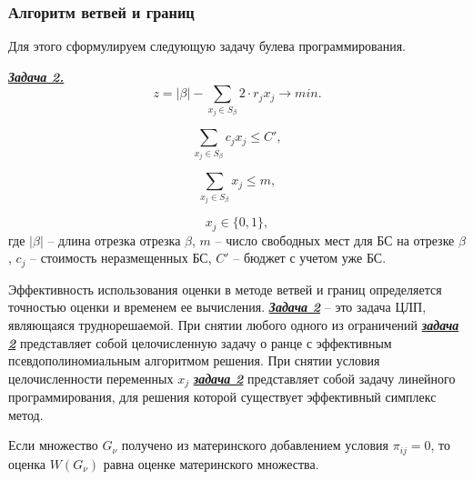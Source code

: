 \begin{frame}
    
    \frametitle{Алгоритм ветвей и границ}
    \fontsize{8pt}{7.2}\selectfont
    Для этого сформулируем следующую задачу булева программирования.

    \underline{\textit{\textbf{Задача 2.}}}
    \begin{displaymath}\label{present:task2}
        z = |\beta| - \sum\limits_{x_j \in S_\beta} 2 \cdot r_j x_j \rightarrow min.
    \end{displaymath}

    \begin{displaymath}\label{eq:part4_task2_cost}
        \sum\limits_{x_j \in S_\beta} c_j x_j \leqslant C',
    \end{displaymath}

    \begin{displaymath}\label{eq:part4_task2_m}
        \sum\limits_{x_j \in S_\beta} x_j \leqslant m,
    \end{displaymath}

    \begin{displaymath}
        x_j \in \{0, 1\},
    \end{displaymath}
    где $|\beta|$ -- длина отрезка отрезка  $\beta$, $m$ -- число свободных мест для БС на отрезке $\beta$, $c_j$ -- стоимость неразмещенных БС, $C'$ -- бюджет с учетом уже БС.

    \bigskip
    Эффективность использования оценки в методе ветвей и границ определяется точностью оценки и временем ее вычисления. \underline{\textit{\textbf{Задача 2}}} -- это задача ЦЛП, являющаяся труднорешаемой. При снятии любого одного из ограничений \underline{\textit{\textbf{задача 2}}} представляет собой целочисленную задачу о ранце с эффективным псевдополиномиальным алгоритмом решения. При снятии условия целочисленности переменных $x_j$ \underline{\textit{\textbf{задача 2}}} представляет собой задачу линейного программирования, для решения которой существует эффективный симплекс метод.
 
    \bigskip
    Если множество $G_\nu$ получено из материнского добавлением условия $\pi_{ij}=0$, то оценка $W(G_\nu)$ равна оценке материнского множества.

\end{frame}

